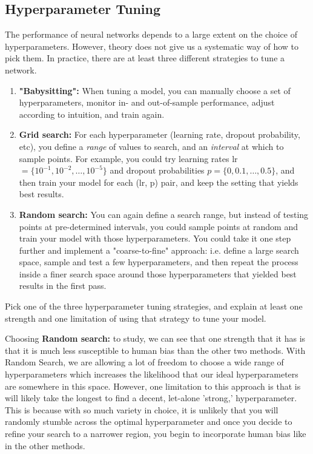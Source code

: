 \subsection{Hyperparameter Tuning}
The performance of neural networks depends to a large extent on the choice of hyperparameters. However, theory does not give us a systematic way of how to pick them. In practice, there are at least three different strategies to tune a network.

\begin{enumerate}
    \item \textbf{"Babysitting":} When tuning a model, you can manually choose a set of hyperparameters, monitor in- and out-of-sample performance, adjust according to intuition, and train again.

    \item \textbf{Grid search:} For each hyperparameter (learning rate, dropout probability, etc), you define a \textit{range} of values to search, and an \textit{interval} at which to sample points. For example, you could try learning rates lr$=\{10^{-1}, 10^{-2}, \ldots, 10^{-5}\}$ and dropout probabilities $p=\{0, 0.1, \ldots, 0.5\}$, and then train your model for each (lr, p) pair, and keep the setting that yields best results.

    \item \textbf{Random search:} You can again define a search range, but instead of testing points at pre-determined intervals, you could sample points at random and train your model with those hyperparameters. You could take it one step further and implement a "coarse-to-fine" approach: i.e. define a large search space, sample and test a few hyperparameters, and then repeat the process inside a finer search space around those hyperparameters that yielded best results in the first pass.
\end{enumerate}
\problem[5] Pick one of the three hyperparameter tuning strategies, and explain at least one strength and one limitation of using that strategy to tune your model.

\begin{subsolution}
  Choosing \textbf{Random search:} to study, we can see that one strength that it has is that it is much less susceptible to human bias than the other two methods. With Random Search, we are allowing a lot of freedom to choose a wide range of hyperparameters which increases the likelihood that our ideal hyperparameters are somewhere in this space. However, one limitation to this approach is that is will likely take the longest to find a decent, let-alone 'strong,' hyperparameter. This is because with so much variety in choice, it is unlikely that you will randomly stumble across the optimal hyperparameter and once you decide to refine your search to a narrower region, you begin to incorporate human bias like in the other methods.
\end{subsolution}

